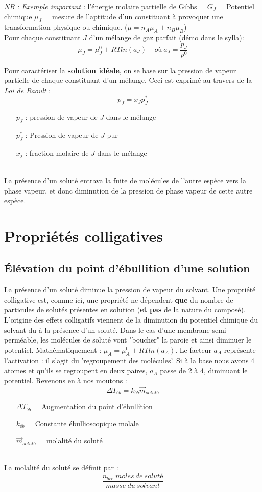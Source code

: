 \documentclass[british,french,11pt, a4paper, openany]{book}
\begin{document}
\textit{NB : Exemple important} : l'énergie molaire partielle de Gibbs = $G_J$ = Potentiel chimique $\mu_J$ = mesure de l'aptitude d'un constituant à provoquer une transformation physique ou chimique. ($\mu = n_A \mu_A + n_B \mu_B$)\\
Pour chaque constituant $J$ d'un mélange de gaz parfait (démo dans le sylla):
$$\mu_J = \mu_J^0 + RT ln(a_J)\ \ \ \ \ où\ a_J = \frac{p_J}{p^0}$$

Pour caractériser la \textbf{solution idéale}, on se base sur la pression de vapeur partielle de chaque constituant d'un mélange. Ceci est exprimé au travers de la \textit{Loi de Raoult} :
$$p_J = x_J p_J^*$$
\begin{itemize}
	\item[$p_J$] : pression de vapeur de $J$ dans le mélange
	\item[$p^*_J$] : Pression de vapeur de $J$ pur
	\item[$x_j$] : fraction molaire de $J$ dans le mélange
\end{itemize}
\ \\ La présence d'un soluté entrava la fuite de molécules de l'autre espèce vers la phase vapeur, et donc diminution de la pression de phase vapeur de cette autre espèce.

\section{Propriétés colligatives}
\subsection{Élévation du point d'ébullition d'une solution}
La présence d'un soluté diminue la pression de vapeur du solvant. Une propriété colligative est, comme ici, une propriété ne dépendent \textbf{que} du nombre de particules de solutés présentes en solution (\textbf{et pas} de la nature du composé).\\
L'origine des effets colligatifs viennent de la diminution du potentiel chimique du solvant du à la présence d'un soluté. Dans le cas d'une membrane semi-perméable, les molécules de soluté vont "boucher" la paroie et ainsi diminuer le potentiel. Mathématiquement : $\mu_A = \mu_A^0 + RT ln(a_A)$. Le facteur $a_A$ représente l'activation : il s'agit du 'regroupement des molécules'. Si à la base nous avons 4 atomes et qu'ils se regroupent en deux paires, $a_A$ passe de 2 à 4, diminuant le potentiel. Revenons en à nos moutons : 
$$\Delta T_{éb} = k_{éb}\vec{m}_{soluté}$$
\begin{itemize}
	\item[$\Delta T_{éb}$] = Augmentation du point d'ébullition
	\item[$k_{éb}$] = Constante ébullioscopique molale
	\item[$\vec{m}_{soluté}$] = molalité du soluté
\end{itemize}
\ \\
La molalité du soluté se définit par : 
$$\frac{n_{bre}\ moles\ de\ soluté}{masse\ du\ solvant}$$
\end{document}
